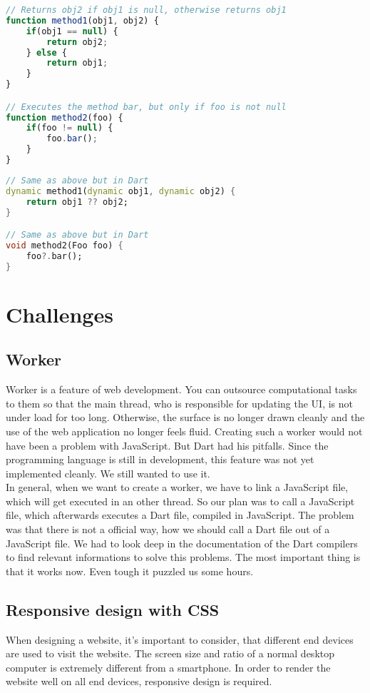 \begin{lstlisting}[language=JavaScript,caption={Example in JavaScript}]
// Returns obj2 if obj1 is null, otherwise returns obj1
function method1(obj1, obj2) {
	if(obj1 == null) {
		return obj2;
	} else {
		return obj1;
	}
}

// Executes the method bar, but only if foo is not null
function method2(foo) {
	if(foo != null) {
		foo.bar();
	}
}
\end{lstlisting}

\begin{lstlisting}[language=Dart,caption={Example in Dart}]
// Same as above but in Dart
dynamic method1(dynamic obj1, dynamic obj2) {
	return obj1 ?? obj2;
}

// Same as above but in Dart
void method2(Foo foo) {
	foo?.bar();
}
\end{lstlisting}


\section{Challenges}
\subsection{Worker}
Worker is a feature of web development. You can outsource computational tasks to them so that the main thread, who is responsible for updating the UI, is not under load for too long. Otherwise, the surface is no longer drawn cleanly and the use of the web application no longer feels fluid. Creating such a worker would not have been a problem with JavaScript. But Dart had his pitfalls. Since the programming language is still in development, this feature was not yet implemented cleanly. We still wanted to use it.\\
In general, when we want to create a worker, we have to link a JavaScript file, which will get executed in an other thread. So our plan was to call a JavaScript file, which afterwards executes a Dart file, compiled in JavaScript. The problem was that there is not a official way, how we should call a Dart file out of a JavaScript file. We had to look deep in the documentation of the Dart compilers to find relevant informations to solve this problems. The most important thing is that it works now. Even tough it puzzled us some hours.

\subsection{Responsive design with CSS}
When designing a website, it's important to consider, that different end devices are used to visit the website. The screen size and ratio of a normal desktop computer is extremely different from a smartphone. In order to render the website well on all end devices, \ac{responsive} design is required. 

